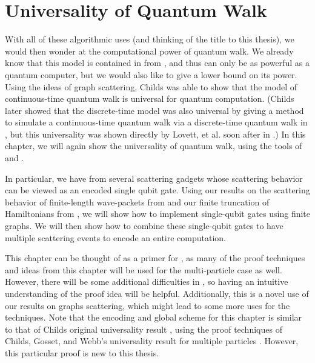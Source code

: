 \documentclass[../thesis-main/thesis-main]{subfiles}
\begin{document}
\chapter{Universality of Quantum Walk}
\label{chap:SP_universality}




With all of these algorithmic uses (and thinking of the title to this thesis), we would then wonder at the computational power of quantum walk.   We already know that this model is contained in \BQP{} from , and thus can only be as powerful as a quantum computer, but we would also like to give a lower bound on its power.  Using the ideas of graph scattering, Childs \cite{Chi09} was able to show that the model of continuous-time quantum walk is universal for quantum computation. (Childs later showed that the discrete-time model was also universal by giving a method to simulate a continuous-time quantum walk via a discrete-time quantum walk in \cite{Chi10}, but this universality was shown directly by Lovett, et al. soon after in \cite{LCETK10}.)  In this chapter, we will again show the universality of quantum walk, using the tools of  and .  

In particular, we have from  several scattering gadgets whose scattering behavior can be viewed as an encoded single qubit gate.  Using our results on the scattering behavior of finite-length wave-packets from  and our finite truncation of Hamiltonians from , we will show how to implement single-qubit gates using finite graphs.  We will then show how to combine these single-qubit gates to have multiple scattering events to encode an entire computation.

This chapter can be thought of as a primer for , as many of the proof techniques and ideas from this chapter will be used for the multi-particle case as well.  However, there will be some additional difficulties in , so having an intuitive understanding of the proof idea will be helpful.  Additionally, this is a novel use of our results on graphs scattering, which might lead to some more uses for the techniques.  Note that the encoding and global scheme for this chapter is similar to that of Childs original universality result \cite{Chi09}, using the proof techniques of Childs, Gosset, and Webb's universality result for multiple particles \cite{MPQW}.  However, this particular proof is new to this thesis.
\end{document}
